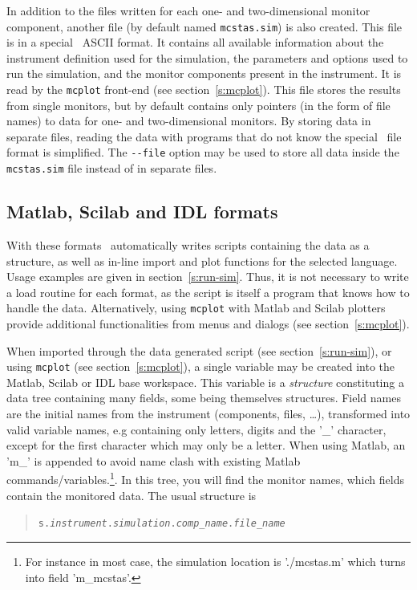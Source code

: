 In addition to the files written for each one- and two-dimensional monitor
component, another file (by default named \verb+mcstas.sim+) is also
created. This file is in a special \MCS\ ASCII format. It contains all available
information about the instrument definition used for the simulation, the
parameters and options used to run the simulation, and the monitor components
present in the instrument. It is read by the \verb+mcplot+ front-end (see
section~\ref{s:mcplot}). This file stores the results from single monitors, but
by default contains only pointers (in the form of file names) to data for one-
and two-dimensional monitors. By storing data in separate files, reading the
data with programs that do not know the special \MCS\ file format is
simplified. The \verb+--file+ option may be used to store all data inside the
\verb+mcstas.sim+ file instead of in separate files.

\subsection{Matlab, Scilab and IDL formats}
   

With these formats \MCS\ automatically writes scripts containing the data as a
structure, as well as in-line import and plot functions for the selected
language. Usage examples are given in section~\ref{s:run-sim}.  Thus, it is not
necessary to write a load routine for each format, as the script is itself a
program that knows how to handle the data. Alternatively, using \verb+mcplot+
with Matlab and Scilab plotters provide additional functionalities from menus
and dialogs (see section~\ref{s:mcplot}).

When imported through the data generated script (see section~\ref{s:run-sim}),
or using \verb+mcplot+ (see section~\ref{s:mcplot}), a single variable may be
created into the Matlab, Scilab or IDL base workspace. This variable is a
\emph{structure} constituting a data tree containing many fields, some being
themselves structures. Field names are the initial names from the instrument
(components, files, \ldots), transformed into valid variable names, e.g
containing only letters, digits and the '\_' character, except for the first
character which may only be a letter. When using Matlab, an 'm\_' is appended to
avoid name clash with existing Matlab commands/variables.\footnote{For instance
  in most case, the simulation location is './mcstas.m' which turns into field
  'm\_mcstas'.}.  In this tree, you will find the monitor names, which fields
contain the monitored data. The usual structure is
\begin{quote}
  \texttt{s.{\it instrument}.{\it simulation}.{\it comp\_name}.{\it file\_name}}
\end{quote}

